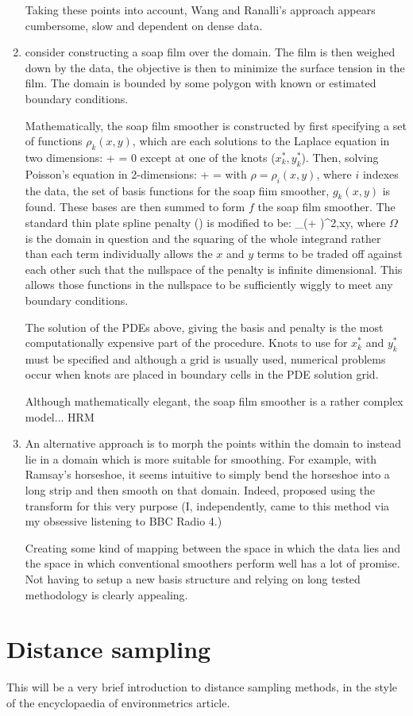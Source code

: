 \begin{enumerate}
Taking these points into account, Wang and Ranalli's approach appears cumbersome, slow and dependent on dense data.

\item \cite{soap} consider constructing a soap film over the domain. The film is then weighed down by the data, the objective is then to minimize the surface tension in the film. The domain is bounded by some polygon with known or estimated boundary conditions.

Mathematically, the soap film smoother is constructed by first specifying a set of functions $\rho_k(x,y)$, which are each solutions to the Laplace equation in two dimensions:
\be
{} +  = 0
\ee
except at one of the knots ($x^*_k,y^*_k$). Then, solving Poisson's equation in 2-dimensions:
\be
{} +  = \rho
\ee
with $\rho=\rho_i(x,y)$, where $i$ indexes the data, the set of basis functions for the soap fiim smoother, $g_k(x,y)$ is found. These bases are then summed to form $f$ the soap film smoother. The standard thin plate spline penalty () is modified to be:
\be
\int_\Omega \Big(+ \Big)^2,xy,
\ee
where $\Omega$ is the domain in question and the squaring of the whole integrand rather than each term individually allows the $x$ and $y$ terms to be traded off against each other such that the nullspace of the penalty is infinite dimensional. This allows those functions in the nullspace to be sufficiently wiggly to meet any boundary conditions.

The solution of the PDEs above, giving the basis and penalty is the most computationally expensive part of the procedure. Knots to use for $x_k^*$ and $y_k^*$ must be specified and although a grid is usually used, numerical problems occur when knots are placed in boundary cells in the PDE solution grid.

Although mathematically elegant, the soap film smoother is a rather complex model... HRM

\item An alternative approach is to morph the points within the domain to instead lie in a domain which is more suitable for smoothing. For example, with Ramsay's horseshoe, it seems intuitive to simply bend the horseshoe into a long strip and then smooth on that domain. Indeed, \cite{eilerstalk} proposed using the \sch transform for this very purpose (I, independently, came to this method via my obsessive listening to BBC Radio 4.)

Creating some kind of mapping between the space in which the data lies and the space in which conventional smoothers perform well has a lot of promise. Not having to setup a new basis structure and relying on long tested methodology is clearly appealing.

\end{enumerate}

\section{Distance sampling}

This will be a very brief introduction to distance sampling methods, in the style of the encyclopaedia of environmetrics article.
